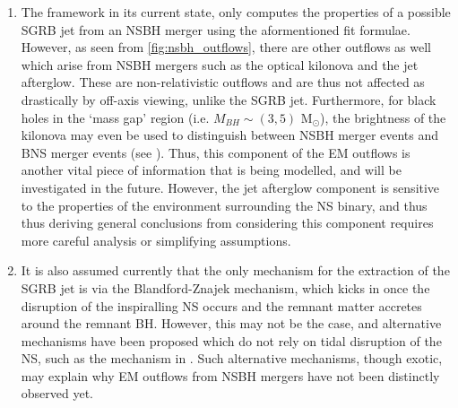 \begin{enumerate}
            \item The framework in its current state, only computes the properties of
                a possible SGRB jet from an NSBH merger using the aformentioned fit
                formulae. However, as seen from \ref{fig:nsbh_outflows}, there are other
                outflows as well which arise from NSBH mergers such as the optical
                kilonova and the jet afterglow. These are non-relativistic outflows and
                are thus not affected as drastically by off-axis viewing, unlike the
                SGRB jet. Furthermore, for black holes in the `mass gap' region (i.e.
                $M_{BH} \sim (3, 5)$ M$_\odot$), the brightness of the kilonova may even
                be used to distinguish between NSBH merger events and BNS merger events
                (see \cite{barbieri_2019b}). Thus, this component of the EM outflows is
                another vital piece of information that is being modelled, and will be
                investigated in the future. However, the jet afterglow component is
                sensitive to the properties of the environment surrounding the NS
                binary, and thus thus deriving general conclusions from considering this
                component requires more careful analysis or simplifying assumptions.

            \item It is also assumed currently that the only mechanism for the
                extraction of the SGRB jet is via the Blandford-Znajek mechanism, which
                kicks in once the disruption of the inspiralling NS occurs and the
                remnant matter accretes around the remnant BH. However, this may not be
                the case, and alternative mechanisms have been proposed which do not
                rely on tidal disruption of the NS, such as the mechanism in
                \cite{east_2020}. Such alternative mechanisms, though exotic, may
                explain why EM outflows from NSBH mergers have not been distinctly
                observed yet.


\end{enumerate}
